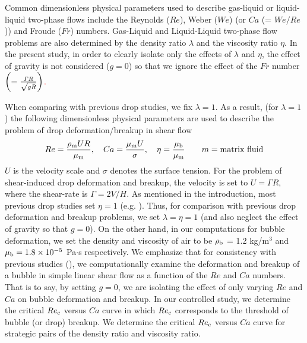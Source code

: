 \documentclass{elsarticle}
\begin{document}
Common dimensionless physical parameters used to describe gas-liquid or
liquid-liquid two-phase flows include the Reynolds ($Re$), Weber ($We$) (or
$Ca$ (= $We/Re$)) and Froude ($Fr$) numbers.  Gas-Liquid and Liquid-Liquid
two-phase flow problems are also determined by the density ratio $\lambda$ and
the viscosity ratio $\eta$.  In the present study, in order to clearly isolate only the effects 
of $\lambda$ and $\eta$, the effect of gravity is not considered ($g = 0$) so that 
we ignore the effect of the $Fr$ number 
\textcolor{red}
{
$\left(= \frac{{\it \Gamma}R}{\sqrt {gR}} \right)$.
}

When comparing with previous drop studies, we fix $\lambda=1$.  As a result,
(for $\lambda=1$) the following dimensionless physical parameters are used to
describe the problem of drop deformation/breakup in shear flow
%
\begin{eqnarray}\label{dimensonless}
  Re = \frac{\rho_{\rm m}UR}{\mu_{\rm m}}, \quad
  Ca = \frac{\mu_{\rm m}U}{\sigma}, \quad
  \eta = \frac{\mu_{\rm b}}{\mu_{\rm m}} 
	\hspace{20pt} m=\mbox{matrix fluid}
\end{eqnarray}
%
$U$ is the velocity scale and $\sigma$ denotes the surface tension.  For the
problem of shear-induced drop deformation and breakup, the velocity is set to
$U = \mathit{\Gamma} R$, where the shear-rate is $\mathit{\Gamma} = 2V/H$.  As
mentioned in the introduction, most previous drop studies set $\eta = 1$ (e.g.
\citet{LiRenRen00}).  Thus, for comparison with previous drop deformation and
breakup problems, we set $\lambda = \eta = 1$ (and also neglect the effect of
gravity so that $g=0$). On the other hand, in our computations for bubble
deformation, we set the density and viscosity of air to be $\rho_{\rm b}$ = 1.2
kg/m$^{3}$ and $\mu_{\rm b} = 1.8 \times 10^{-5}$ Pa$\cdot$s respectively.  We
emphasize that for consistency with previous studies (\citet{LiRenRen00,
RusMan02, MulTobDreFisWin08, KomShaEskDer14, AmaBalCasOli19}), we
computationally examine the deformation and breakup of a bubble in simple
linear shear flow as a function of the $Re$ and $Ca$ numbers.  That is to say,
by setting $g=0$, we are isolating the effect of only varying $Re$ and $Ca$ on
bubble deformation and breakup.  In our controlled study, we determine the
critical $Re_{\rm c}$ versus $Ca$ curve in which $Re_{\rm c}$ corresponds to
the threshold of bubble (or drop) breakup.  We determine the critical $Re_{\rm
c}$ versus $Ca$ curve for strategic pairs of the density ratio and viscosity
ratio.
\end{document}
